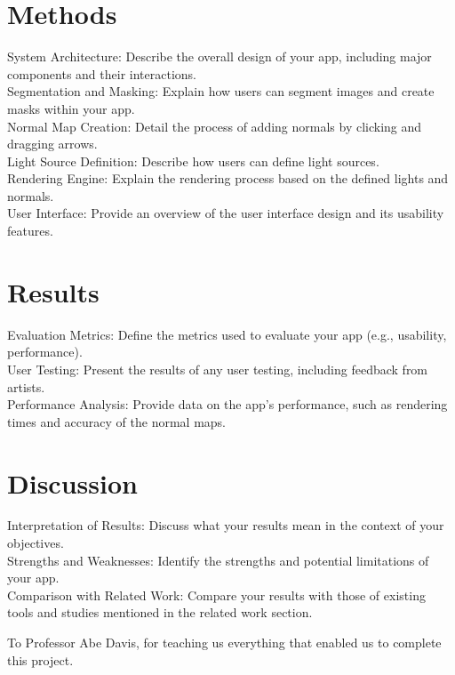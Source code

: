 \documentclass[format=sigconf, review=false, nonacm=true]{acmart}
\begin{document}
\section{Methods}
System Architecture: Describe the overall design of your app, including major components and their interactions.\\
Segmentation and Masking: Explain how users can segment images and create masks within your app.\\
Normal Map Creation: Detail the process of adding normals by clicking and dragging arrows.\\
Light Source Definition: Describe how users can define light sources.\\
Rendering Engine: Explain the rendering process based on the defined lights and normals.\\
User Interface: Provide an overview of the user interface design and its usability features.

\section{Results}
Evaluation Metrics: Define the metrics used to evaluate your app (e.g., usability, performance).\\
User Testing: Present the results of any user testing, including feedback from artists.\\
Performance Analysis: Provide data on the app’s performance, such as rendering times and accuracy of the normal maps.

\section{Discussion}
Interpretation of Results: Discuss what your results mean in the context of your objectives.\\
Strengths and Weaknesses: Identify the strengths and potential limitations of your app.\\
Comparison with Related Work: Compare your results with those of existing tools and studies mentioned in the related work section.


\begin{acks}
To Professor Abe Davis, for teaching us everything that enabled us to complete this project.
\end{acks}
\end{document}
